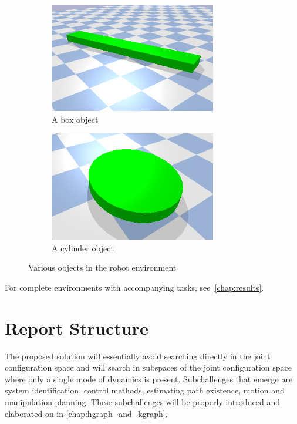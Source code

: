 \begin{figure}[H]
    \centering
    \begin{subfigure}{.5\textwidth}
    \centering
    \includegraphics[width=0.8\textwidth]{figures/box_object.png}
    \caption{A box object}
    \end{subfigure}%
    \begin{subfigure}{.5\textwidth}
    \centering
    \includegraphics[width=0.8\textwidth]{figures/cylinder_object.png}
    \caption{A cylinder object}
    \end{subfigure}%
    \caption{Various objects in the robot environment}%
    \label{fig:example_objects}
\end{figure}

For complete environments with accompanying tasks, see~\cref{chap:results}.\bs


\section{Report Structure}%
\label{sec:report_structure}



The proposed solution will essentially avoid searching directly in the joint configuration space and will search in subspaces of the joint configuration space where only a single mode of dynamics is present. Subchallenges that emerge are system identification, control methods, estimating path existence, motion and manipulation planning. These subchallenges will be properly introduced and elaborated on in \cref{chap:hgraph_and_kgraph}.\bs



